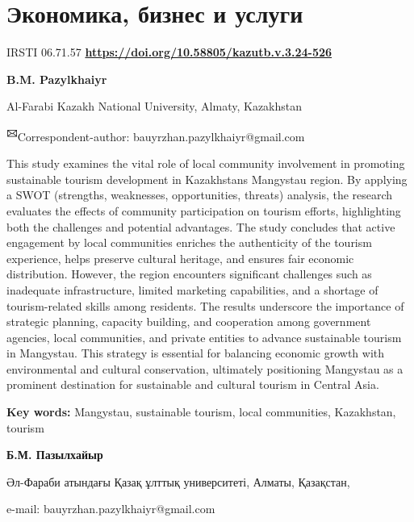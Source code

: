 \let\cleardoublepage\clearpage
\part{Экономика, бизнес и услуги}
IRSTI 06.71.57
\hfill {\bfseries \href{https://doi.org/10.58805/kazutb.v.3.24-526}{https://doi.org/10.58805/kazutb.v.3.24-526}}


\begin{center}
{\bfseries B.M. Pazylkhaiyr}

Al-Farabi Kazakh National University, Almaty, Kazakhstan
\end{center}

{\bfseries \textsuperscript{🖂}}Correspondent-author: bauyrzhan.pazylkhaiyr@gmail.com

This study examines the vital role of local community involvement in
promoting sustainable tourism development in
Kazakhstan\textquotesingle s Mangystau region. By applying a SWOT
(strengths, weaknesses, opportunities, threats) analysis, the research
evaluates the effects of community participation on tourism efforts,
highlighting both the challenges and potential advantages. The study
concludes that active engagement by local communities enriches the
authenticity of the tourism experience, helps preserve cultural
heritage, and ensures fair economic distribution. However, the region
encounters significant challenges such as inadequate infrastructure,
limited marketing capabilities, and a shortage of tourism-related skills
among residents. The results underscore the importance of strategic
planning, capacity building, and cooperation among government agencies,
local communities, and private entities to advance sustainable tourism
in Mangystau. This strategy is essential for balancing economic growth
with environmental and cultural conservation, ultimately positioning
Mangystau as a prominent destination for sustainable and cultural
tourism in Central Asia.

{\bfseries Key words:} Mangystau, sustainable tourism, local communities,
Kazakhstan, tourism


\begin{center}
{\bfseries Б.М. Пазылхайыр}

Әл-Фараби атындағы Қазақ ұлттық университеті, Алматы, Қазақстан,

e-mail: bauyrzhan.pazylkhaiyr@gmail.com
\end{center}

